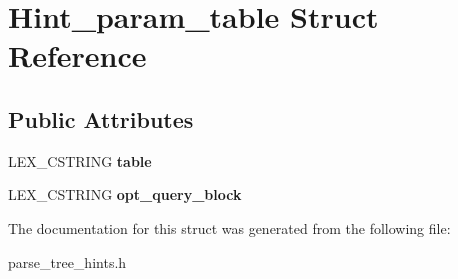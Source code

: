\hypertarget{structHint__param__table}{}\section{Hint\+\_\+param\+\_\+table Struct Reference}
\label{structHint__param__table}
\subsection*{Public Attributes}
\begin{DoxyCompactItemize}
\item 
\mbox{\label{structHint__param__table_a04ee9ece90b072af2c3c41939061926d}} 
L\+E\+X\+\_\+\+C\+S\+T\+R\+I\+NG {\bfseries table}
\item 
\mbox{\label{structHint__param__table_adeb0e736cf6fa82b49fdff8f2e5ab83c}} 
L\+E\+X\+\_\+\+C\+S\+T\+R\+I\+NG {\bfseries opt\+\_\+query\+\_\+block}
\end{DoxyCompactItemize}


The documentation for this struct was generated from the following file\+:\begin{DoxyCompactItemize}
\item 
parse\+\_\+tree\+\_\+hints.\+h\end{DoxyCompactItemize}

